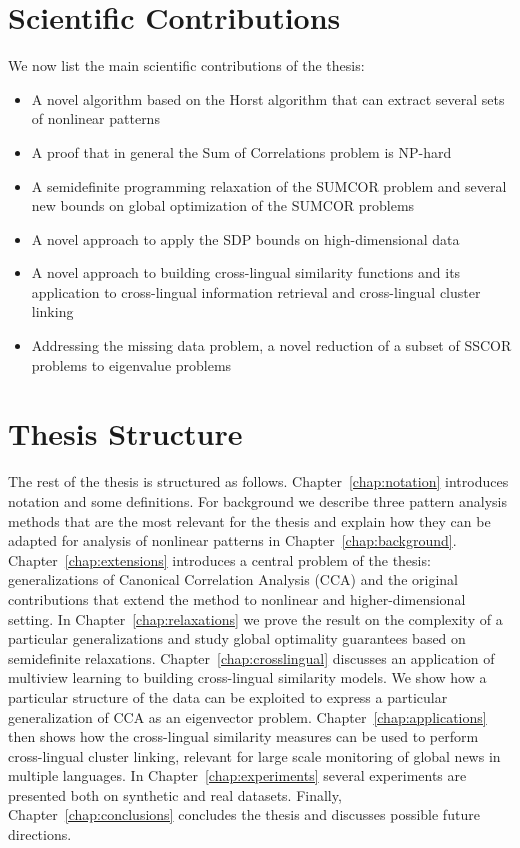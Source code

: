\section{Scientific Contributions}

We now list the main scientific contributions of the thesis:
\begin{itemize}
\item A novel algorithm based on the Horst algorithm that can extract several sets of nonlinear patterns
\item A proof that in general the Sum of Correlations problem is NP-hard
\item A semidefinite programming relaxation of the SUMCOR problem and
several new bounds on global optimization of the SUMCOR problems
\item A novel approach to apply the SDP bounds on high-dimensional data
\item A novel approach to building cross-lingual similarity functions and its application to cross-lingual information retrieval and cross-lingual cluster linking
\item Addressing the missing data problem, a novel reduction of a subset of SSCOR problems to eigenvalue problems
\end{itemize}

\section{Thesis Structure}

The rest of the thesis is structured as follows. Chapter~\ref{chap:notation} introduces notation and some
definitions. For background we describe three pattern analysis methods that are the most relevant
for the thesis and explain how they can be adapted for analysis of nonlinear patterns in Chapter~\ref{chap:background}. Chapter~\ref{chap:extensions}
introduces a central problem of the thesis: generalizations of Canonical Correlation Analysis (CCA) and the original
contributions that extend the method to nonlinear and higher-dimensional setting. In Chapter~\ref{chap:relaxations}
we prove the result on the complexity of a particular generalizations and study global optimality guarantees based
on semidefinite relaxations. Chapter~\ref{chap:crosslingual} discusses an application of multiview learning
to building cross-lingual similarity models. We show how a particular structure of the data can be exploited
to express a particular generalization of CCA as an eigenvector problem. Chapter~\ref{chap:applications} then
shows how the cross-lingual similarity measures can be used to perform cross-lingual cluster linking, relevant
for large scale monitoring of global news in multiple languages. In Chapter~\ref{chap:experiments} several experiments
are presented both on synthetic and real datasets. Finally, Chapter~\ref{chap:conclusions} concludes the thesis
and discusses possible future directions. 